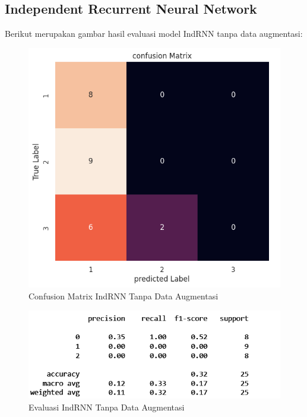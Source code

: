 \subsection{Independent Recurrent Neural Network}

Berikut merupakan gambar hasil evaluasi model IndRNN tanpa data augmentasi:
\newpage
\begin{figure} [ht] \centering
  \includegraphics[scale=0.7]{gambar/CMIndRNNnoaug.png}
  \caption{Confusion Matrix IndRNN Tanpa Data Augmentasi}
  \label{fig:CMIndRNNnoaug}
\end{figure}

\begin{figure} [ht] \centering
  \includegraphics[scale=0.55]{gambar/scoreIndRNNnoaug.png}
  \caption{Evaluasi IndRNN Tanpa Data Augmentasi}
  \label{fig:ScoreIndRNNnoaug}
\end{figure}

